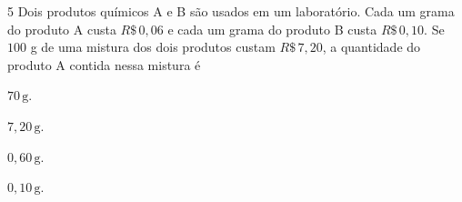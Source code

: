 

\num{5}  Dois produtos químicos A e B são usados em um laboratório. Cada um grama do
produto A custa $R\$\,0,06$ e cada um grama do produto B custa
$R\$\,0,10$. Se $100$ g de uma mistura dos dois produtos custam $R\$\,7,20$, a
quantidade do produto A contida nessa mistura é

\begin{escolha}
\item $70\,\text{g}$.
\item $7,20\,\text{g}$.
\item $0,60\,\text{g}$.
\item $0,10\,\text{g}$.
\end{escolha}



